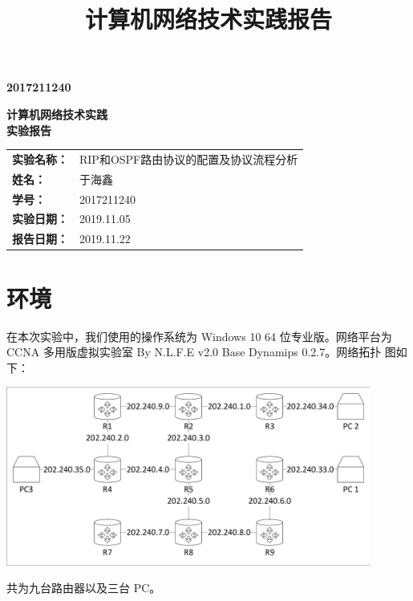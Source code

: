 \documentclass[black,normal,cn]{elegantnote}
\title{计算机网络技术实践报告}
\begin{document}
\begin{titlepage}
    \bfseries{2017211240}
    \vspace{4cm}
    \begin{center}
        \bfseries\huge{计算机网络技术实践}\\
        \vspace{0.5cm}
        \bfseries\huge{实验报告}
        \vspace{3cm}
        \begin{center}
          \large
          \linespread{2}
          \centering
          \renewcommand\arraystretch{1.6}
          \begin{tabular}{p{3cm}P{6cm}}
            \bfseries{实验名称：}       & RIP和OSPF路由协议的配置及协议流程分析   \\ 
            \bfseries{姓名：}           & 于海鑫   \\ 
            \bfseries{学号：}           & 2017211240  \\ 
            \bfseries{实验日期：}        & 2019.11.05 \\ 
            \bfseries{报告日期：}        & 2019.11.22 \\ 
          \end{tabular}
        \end{center}
      \end{center}
\end{titlepage}

\section{环境}
在本次实验中，我们使用的操作系统为 Windows 10 64 位专业版。网络平台为
CCNA 多用版虚拟实验室 By N.L.F.E v2.0 Base Dynamips 0.2.7。网络拓扑
图如下：

\includegraphics[width=0.9\textwidth]{../data/Lab3.pdf}

共为九台路由器以及三台 PC。
\end{document}
